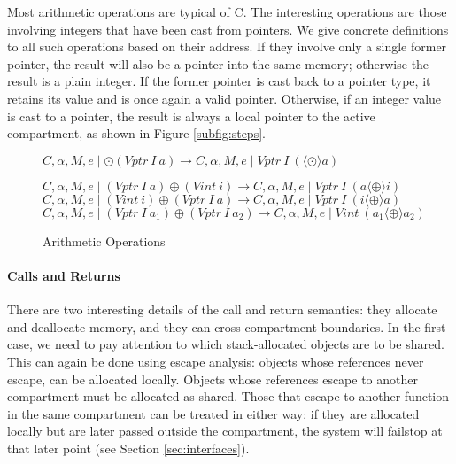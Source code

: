 \documentclass{article}
\begin{document}
Most arithmetic operations are typical of C. The interesting operations are those
involving integers that have been cast from pointers. We give concrete definitions
to all such operations based on their address. If they involve only a single former
pointer, the result will also be a pointer into the same memory; otherwise the result
is a plain integer. If the former pointer is cast back to a pointer type,
it retains its value and is once again a valid pointer. Otherwise, if an integer
value is cast to a pointer, the result is always a local pointer to
the active compartment, as shown in Figure \ref{subfig:steps}.

\begin{figure}
  \judgment{}
           {\(C,\alpha,M,e \mid \odot (\mathit{Vptr} ~ I ~ a) \longrightarrow
           C,\alpha,M,e \mid \mathit{Vptr} ~ I ~ (\langle \odot \rangle a)\)}

  \judgment{}
           {\(C,\alpha,M,e \mid (\mathit{Vptr} ~ I ~ a) \oplus
             (\mathit{Vint} ~ i) \longrightarrow
           C,\alpha,M,e \mid \mathit{Vptr} ~ I ~ (a \langle \oplus \rangle i)\)}
  \judgment{}
           {\(C,\alpha,M,e \mid (\mathit{Vint} ~ i) \oplus
             (\mathit{Vptr} ~ I ~ a) \longrightarrow
           C,\alpha,M,e \mid \mathit{Vptr} ~ I ~ (i \langle \oplus \rangle a)\)}
  \judgment{}
           {\(C,\alpha,M,e \mid (\mathit{Vptr} ~ I ~ a_1) \oplus
             (\mathit{Vptr} ~ I ~ a_2) \longrightarrow
           C,\alpha,M,e \mid \mathit{Vint} ~ (a_1 \langle \oplus \rangle a_2)\)}

  \caption{Arithmetic Operations}
  \label{fig:arith}
\end{figure}

\paragraph{Calls and Returns}

There are two interesting details of the call and return semantics:
they allocate and deallocate memory, and they can cross compartment boundaries.
In the first case, we need to pay attention to which stack-allocated
objects are to be shared. This can again be done using escape analysis:
objects whose references never escape, can be allocated locally. Objects whose
references escape to another compartment must be allocated as shared.
Those that escape to another function in the same compartment can be treated
in either way; if they are allocated locally but are later passed outside the
compartment, the system will failstop at that later point
(see Section \ref{sec:interfaces}).
\end{document}
